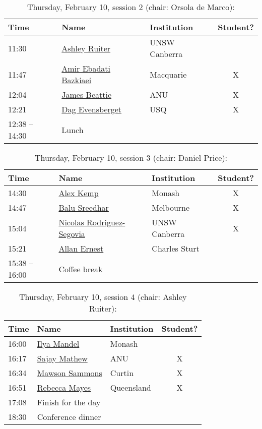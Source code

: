 \documentclass[amsmath,onecolumn]{revtex4-1}
\begin{document}
\begin{table}[!htbp]
	\centering
	\caption{Thursday, February 10, session 2 (chair: Orsola de Marco):}
\begin{tabular}{| l | l | l | c |}
	\hline
	Time & Name  & Institution & Student? \\ 		
	\hline
	11:30 & \href{https://forms.gle/ZM8HoYqw1VRShzLNA}{Ashley Ruiter} & UNSW Canberra &  \\
	11:47 & \href{https://forms.gle/ZM8HoYqw1VRShzLNA}{Amir Ebadati Bazkiaei} & Macquarie &  X \\
	12:04 &  \href{https://forms.gle/bdRTLLNorm3c2uaN7}{James Beattie} & ANU & X \\
	12:21 &  \href{https://forms.gle/ZM8HoYqw1VRShzLNA}{Dag Evensberget} & USQ & X\\
	12:38 -- 14:30 & Lunch & & \\
	\hline
\end{tabular}
\end{table}	


\begin{table}[!htbp]
	\centering
	\caption{Thursday, February 10, session 3 (chair: Daniel Price):}
\begin{tabular}{| l | l | l | c |}
	\hline
	Time & Name  & Institution & Student? \\ 		
	\hline
	14:30 & \href{https://forms.gle/ZM8HoYqw1VRShzLNA}{Alex Kemp} & Monash & X  \\
	14:47 & \href{https://forms.gle/ZM8HoYqw1VRShzLNA}{Balu Sreedhar} & Melbourne & X \\
	15:04 &  \href{https://forms.gle/ZM8HoYqw1VRShzLNA}{Nicolas Rodriguez-Segovia} & UNSW Canberra & X\\
	15:21 &  \href{https://forms.gle/ZM8HoYqw1VRShzLNA}{Allan Ernest} &  Charles Sturt&  \\
	15:38 -- 16:00 & Coffee break & & \\
	\hline
\end{tabular}
\end{table}

\begin{table}[!htbp]
	\centering
	\caption{Thursday, February 10, session 4 (chair: Ashley Ruiter):}
\begin{tabular}{| l | l | l | c |}
	\hline
	Time & Name  & Institution & Student? \\ 		
	\hline
	16:00 & \href{https://forms.gle/ZM8HoYqw1VRShzLNA}{Ilya Mandel} & Monash &  \\
	16:17 & \href{https://forms.gle/ZM8HoYqw1VRShzLNA}{Sajay Mathew} & ANU & X \\
	16:34 &  \href{https://forms.gle/ZM8HoYqw1VRShzLNA}{Mawson Sammons} & Curtin & X \\
	16:51 &  \href{https://forms.gle/ZM8HoYqw1VRShzLNA}{Rebecca Mayes} & Queensland & X \\
	17:08 & Finish for the day & & \\
	18:30 & Conference dinner & & \\
	\hline
\end{tabular}
\end{table}
\end{document}
